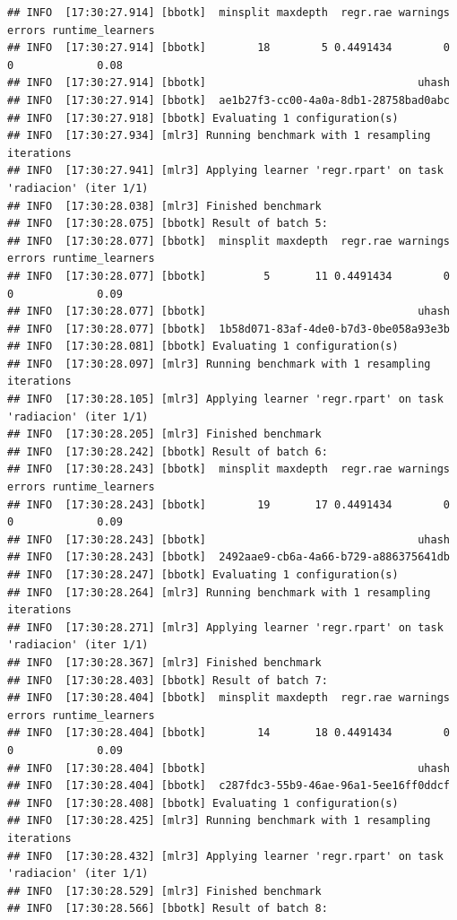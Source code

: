 \documentclass[
  11pt,
  a4paper,
]{article}
\begin{document}
\begin{verbatim}
## INFO  [17:30:27.914] [bbotk]  minsplit maxdepth  regr.rae warnings errors runtime_learners
## INFO  [17:30:27.914] [bbotk]        18        5 0.4491434        0      0             0.08
## INFO  [17:30:27.914] [bbotk]                                 uhash
## INFO  [17:30:27.914] [bbotk]  ae1b27f3-cc00-4a0a-8db1-28758bad0abc
## INFO  [17:30:27.918] [bbotk] Evaluating 1 configuration(s)
## INFO  [17:30:27.934] [mlr3] Running benchmark with 1 resampling iterations
## INFO  [17:30:27.941] [mlr3] Applying learner 'regr.rpart' on task 'radiacion' (iter 1/1)
## INFO  [17:30:28.038] [mlr3] Finished benchmark
## INFO  [17:30:28.075] [bbotk] Result of batch 5:
## INFO  [17:30:28.077] [bbotk]  minsplit maxdepth  regr.rae warnings errors runtime_learners
## INFO  [17:30:28.077] [bbotk]         5       11 0.4491434        0      0             0.09
## INFO  [17:30:28.077] [bbotk]                                 uhash
## INFO  [17:30:28.077] [bbotk]  1b58d071-83af-4de0-b7d3-0be058a93e3b
## INFO  [17:30:28.081] [bbotk] Evaluating 1 configuration(s)
## INFO  [17:30:28.097] [mlr3] Running benchmark with 1 resampling iterations
## INFO  [17:30:28.105] [mlr3] Applying learner 'regr.rpart' on task 'radiacion' (iter 1/1)
## INFO  [17:30:28.205] [mlr3] Finished benchmark
## INFO  [17:30:28.242] [bbotk] Result of batch 6:
## INFO  [17:30:28.243] [bbotk]  minsplit maxdepth  regr.rae warnings errors runtime_learners
## INFO  [17:30:28.243] [bbotk]        19       17 0.4491434        0      0             0.09
## INFO  [17:30:28.243] [bbotk]                                 uhash
## INFO  [17:30:28.243] [bbotk]  2492aae9-cb6a-4a66-b729-a886375641db
## INFO  [17:30:28.247] [bbotk] Evaluating 1 configuration(s)
## INFO  [17:30:28.264] [mlr3] Running benchmark with 1 resampling iterations
## INFO  [17:30:28.271] [mlr3] Applying learner 'regr.rpart' on task 'radiacion' (iter 1/1)
## INFO  [17:30:28.367] [mlr3] Finished benchmark
## INFO  [17:30:28.403] [bbotk] Result of batch 7:
## INFO  [17:30:28.404] [bbotk]  minsplit maxdepth  regr.rae warnings errors runtime_learners
## INFO  [17:30:28.404] [bbotk]        14       18 0.4491434        0      0             0.09
## INFO  [17:30:28.404] [bbotk]                                 uhash
## INFO  [17:30:28.404] [bbotk]  c287fdc3-55b9-46ae-96a1-5ee16ff0ddcf
## INFO  [17:30:28.408] [bbotk] Evaluating 1 configuration(s)
## INFO  [17:30:28.425] [mlr3] Running benchmark with 1 resampling iterations
## INFO  [17:30:28.432] [mlr3] Applying learner 'regr.rpart' on task 'radiacion' (iter 1/1)
## INFO  [17:30:28.529] [mlr3] Finished benchmark
## INFO  [17:30:28.566] [bbotk] Result of batch 8:

\end{verbatim}
\end{document}
